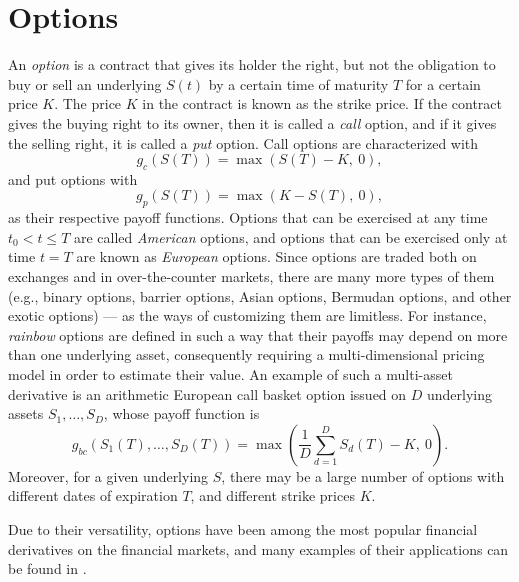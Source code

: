\documentclass{UUThesisTemplate}
\begin{document}
\section{Options}
\label{sec:options}
\par An \emph{option} is a contract that gives its holder the right, but not the obligation to buy or sell an underlying $S(t)$ by a certain time of maturity $T$ for a certain price $K$. The price $K$ in the contract is known as the strike price. If the contract gives the buying right to its owner, then it is called a \emph{call} option, and if it gives the selling right, it is called a \emph{put} option. Call options are characterized with 
\begin{equation}
\label{eq:callop}
g_c(S(T))=\max(S(T)-K,\ 0),
\end{equation}
and put options with 
\begin{equation}
\label{eq:putop}
g_p(S(T))=\max(K-S(T),\ 0),
\end{equation}
as their respective payoff functions. Options that can be exercised at any time $t_0 < t \leq T$ are called \emph{American} options, and options that can be exercised only at time $t=T$ are known as \emph{European} options. Since options are traded both on exchanges and in over-the-counter markets, there are many more types of them (e.g., binary options, barrier options, Asian options, Bermudan options, and other exotic options) --- as the ways of customizing them are limitless. For instance, \emph{rainbow} options are defined in such a way that their payoffs may depend on more than one underlying asset, consequently requiring a multi-dimensional pricing model in order to estimate their value. An example of such a multi-asset derivative is an arithmetic European call basket option issued on $D$ underlying assets $S_1,\ldots,S_D$, whose payoff function is 
\begin{equation}
\label{eq:basketop}
g_{bc}(S_1(T),\ldots,S_D(T)) = \max\left(\frac{1}{D}\sum_{d=1}^D S_d(T) - K,\ 0\right).
\end{equation}
Moreover, for a given underlying $S$, there may be a large number of options with different dates of expiration $T$, and different strike prices $K$.
\par Due to their versatility, options have been among the most popular financial derivatives on the financial markets, and many examples of their applications can be found in \cite{hull2017options}.
%
%
\end{document}
